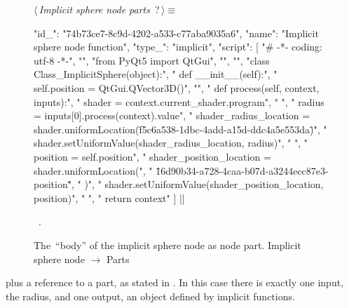 \documentclass[%
    a4paper,    %
    justified,  %
    nobib,      %
    openany     %
]{tufte-book}
\begin{document}
\begin{figure}
\begin{flushleft} \small
\begin{minipage}{\linewidth}\label{scrap104}\raggedright\small
{} $\langle\,${\itshape Implicit sphere node parts}\nobreak\ {\footnotesize {?}}$\,\rangle\equiv$
\vspace{-1ex}
\begin{pythoncode}
{
    "id_": "74b73ce7-8c9d-4202-a533-c77aba9035a6",
    "name": "Implicit sphere node function",
    "type_": "implicit",
    "script": [
        "# -*- coding: utf-8 -*-",
        "",
        "from PyQt5 import QtGui",
        "",
        "",
        "class Class_ImplicitSphere(object):",
        "    def __init__(self):",
        "        self.position = QtGui.QVector3D()",
        "",
        "    def process(self, context, inputs):",
        "        shader = context.current_shader.program",
        "        ",
        "        radius = inputs[0].process(context).value",
        "        shader_radius_location = shader.uniformLocation(\"f5c6a538-1dbc-4add-a15d-ddc4a5e553da\")",
        "        shader.setUniformValue(shader_radius_location, radius)",
        "        ",
        "        position = self.position",
        "        shader_position_location = shader.uniformLocation(",
        "            \"16d90b34-a728-4caa-b07d-a3244ecc87e3-position\"",
        "        )",
        "        shader.setUniformValue(shader_position_location, position)",
        "        ",
        "        return context"
    ]
}|\NWsep|
\end{pythoncode}
\vspace{1.5ex}
\footnotesize
\begin{list}{}{\setlength{\itemsep}{-\parsep}\setlength{\itemindent}{-\leftmargin}}
\item \NWtxtMacroRefIn\ .

\item{}
\end{list}
\end{minipage}\vspace{4ex}
\end{flushleft}
\caption{The~\enquote{body} of the implicit sphere node as node part.
  \newline{}\newline{}Implicit sphere node $\rightarrow$ Parts}
\label{editor:lst:nodes:sphere-node:parts:body}
\end{figure}

 plus a reference
to a part, as stated in . In this case there is exactly one
input, the radius, and one output, an object defined by implicit functions.
\end{document}
